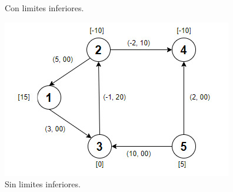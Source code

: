 \documentclass{report}
\begin{document}
\begin{enumerate}[2.1]
\begin{figure}[h!t]
\begin{minipage}[b]{0.4\linewidth}
                \caption{Con limites inferiores.}
                \end{minipage}
                \hspace{0.5cm}
                \begin{minipage}[b]{0.4\linewidth}
                \centering
                \includegraphics[scale = 0.5]{2.42 parte2.jpeg}
                \caption{Sin limites inferiores.}
                \end{minipage}
            \end{figure}
\end{enumerate}
\end{document}
